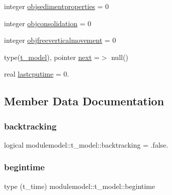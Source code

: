 \begin{DoxyCompactItemize}
\item 
integer \mbox{\hyperlink{structmodulemodel_1_1t__model_a80132555d1368ec71b98b776bceef484}{objsedimentproperties}} = 0
\item 
integer \mbox{\hyperlink{structmodulemodel_1_1t__model_a3e2da1da03e398178d91e78d6b1115a7}{objconsolidation}} = 0
\item 
integer \mbox{\hyperlink{structmodulemodel_1_1t__model_a2f4ff6fbecc5b1cb78080d9efe87e6d1}{objfreeverticalmovement}} = 0
\item 
type(\mbox{\hyperlink{structmodulemodel_1_1t__model}{t\+\_\+model}}), pointer \mbox{\hyperlink{structmodulemodel_1_1t__model_ac035a58c624504d347162b9d27e5237f}{next}} =$>$ null()
\item 
real \mbox{\hyperlink{structmodulemodel_1_1t__model_aa4129cf63f4257f24865777bfab48f56}{lastcputime}} = 0.
\end{DoxyCompactItemize}


\subsection{Member Data Documentation}
\mbox{\label{structmodulemodel_1_1t__model_aff034f47ca46649bb72f4b7694b23378}} 
\subsubsection{\texorpdfstring{backtracking}{backtracking}}
{\footnotesize\ttfamily logical modulemodel\+::t\+\_\+model\+::backtracking = .false.\hspace{0.3cm}{\ttfamily [private]}}

\mbox{\label{structmodulemodel_1_1t__model_a7c04d7ca0dd9c4fe0fbdd0bd4f7e973b}} 
\subsubsection{\texorpdfstring{begintime}{begintime}}
{\footnotesize\ttfamily type (t\+\_\+time) modulemodel\+::t\+\_\+model\+::begintime\hspace{0.3cm}{\ttfamily [private]}}

